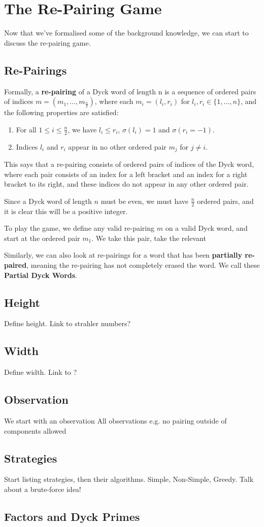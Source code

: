 \section{The Re-Pairing Game}
Now that we've formalised some of the background knowledge, we can start to discuss the re-pairing game. 

\subsection{Re-Pairings}
\begin{definition}
    Formally, a \textbf{re-pairing} of a Dyck word of length n is a sequence of ordered pairs of indices $m = (m_{1}, \dots, m_{\frac{n}{2}})$, where each $m_{i} = (l_{i}, r_{i})$ for $l_{i}, r_{i} \in \{1,\dots,n\}$, and the following properties are satisfied:
    \begin{enumerate}
        \item For all $1\leq i\leq \frac{n}{2}$, we have $l_{i} \leq r_{i}$, $\sigma(l_{i}) = 1$ and $\sigma(r_{i} = -1)$. 
        \item Indices $l_{i}$ and $r_{i}$ appear in no other ordered pair $m_{j}$ for $j \neq i$.
    \end{enumerate}
\end{definition}

This says that a re-pairing consists of ordered pairs of indices of the Dyck word, where each pair consists of an index for a left bracket and an index for a right bracket to its right, and these indices do not appear in any other ordered pair.

Since a Dyck word of length $n$ must be even, we must have $\frac{n}{2}$ ordered pairs, and it is clear this will be a positive integer.

To play the game, we define any valid re-pairing $m$ on a valid Dyck word, and start at the ordered pair $m_{1}$. We take this pair, take the relevant 

Similarly, we can also look at re-pairings for a word that has been \textbf{partially re-paired}, meaning the re-pairing has not completely erased the word. We call these \textbf{Partial Dyck Words}. 

\subsection{Height}
Define height. Link to strahler numbers?

\subsection{Width}
Define width. Link to ?

\subsection{Observation}
We start with an observation
All observations e.g. no pairing outside of components allowed

\subsection{Strategies}
Start listing strategies, then their algorithms. Simple, Non-Simple, Greedy. Talk about a brute-force idea!

\subsection{Factors and Dyck Primes}
